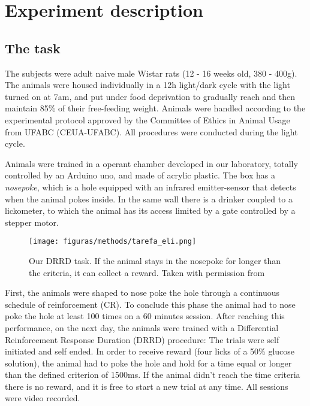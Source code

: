 \chapter{Experiment description}
\label{chap:experiment}

\section{The task}
The subjects were adult naive male Wistar rats (12 - 16 weeks old, 380 - 400g). The animals were housed individually in a 12h light/dark cycle with the light turned on at 7am, and put under food deprivation to gradually reach and then maintain 85\% of their free-feeding weight. Animals were handled according to the experimental protocol approved by the Committee of Ethics in Animal
Usage from UFABC (CEUA-UFABC). All procedures were conducted during the light cycle.

Animals were trained in a operant chamber developed in our laboratory, totally controlled by an Arduino uno, and made of acrylic plastic. The box has a \textit{nosepoke}, which is a hole equipped with an infrared emitter-sensor that detects when the animal pokes inside. In the same wall there is a drinker coupled to a lickometer, to which the animal has its access limited by a gate controlled by a stepper motor.

\begin{figure}
    \centering
    \texttt{[image: figuras/methods/tarefa\_eli.png]}
    \caption[Our DRRD task]{Our DRRD task. If the animal stays in the nosepoke for longer than the criteria, it can collect a reward. Taken with permission from \cite{Eliezyer2018}}
    \label{fig:task}
\end{figure}

\clearpage

First, the animals were shaped to nose poke the hole through a continuous schedule of reinforcement (CR). To conclude this phase the animal had to nose poke the hole at least 100 times on a 60 minutes session. After reaching this performance,
on the next day, the animals were trained with a Differential Reinforcement Response Duration (DRRD) procedure: The trials were self initiated and self ended. In order to receive reward (four licks of a 50\% glucose solution), the animal had to poke the hole and hold for a time equal or longer than the defined criterion of 1500ms. If the animal didn't reach the time criteria there is no reward, and it is free to start a new trial at any time. All sessions were video recorded.